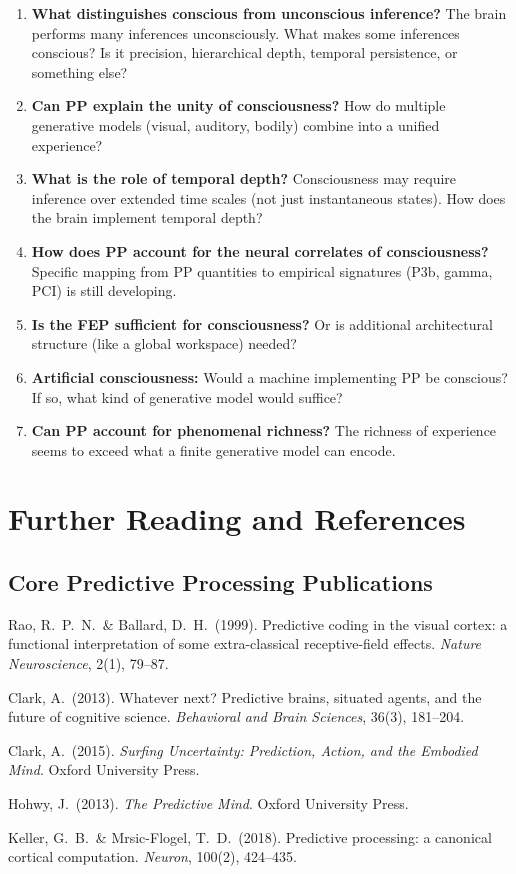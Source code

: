 \documentclass[11pt,a4paper]{report}
\begin{document}
\begin{enumerate}[leftmargin=2em]
  \item \textbf{What distinguishes conscious from unconscious inference?} The brain performs many inferences unconsciously. What makes some inferences conscious? Is it precision, hierarchical depth, temporal persistence, or something else?
  \item \textbf{Can PP explain the unity of consciousness?} How do multiple generative models (visual, auditory, bodily) combine into a unified experience?
  \item \textbf{What is the role of temporal depth?} Consciousness may require inference over extended time scales (not just instantaneous states). How does the brain implement temporal depth?
  \item \textbf{How does PP account for the neural correlates of consciousness?} Specific mapping from PP quantities to empirical signatures (P3b, gamma, PCI) is still developing.
  \item \textbf{Is the FEP sufficient for consciousness?} Or is additional architectural structure (like a global workspace) needed?
  \item \textbf{Artificial consciousness:} Would a machine implementing PP be conscious? If so, what kind of generative model would suffice?
  \item \textbf{Can PP account for phenomenal richness?} The richness of experience seems to exceed what a finite generative model can encode.
\end{enumerate}


\chapter{Further Reading and References}

\section*{Core Predictive Processing Publications}
\begin{enumerate}[label={[\arabic*]}, leftmargin=2.5em]
  \item Rao, R.\ P.\ N.\ \& Ballard, D.\ H.\ (1999). Predictive coding in the visual cortex: a functional interpretation of some extra-classical receptive-field effects. \textit{Nature Neuroscience}, 2(1), 79--87.
  \item Clark, A.\ (2013). Whatever next? Predictive brains, situated agents, and the future of cognitive science. \textit{Behavioral and Brain Sciences}, 36(3), 181--204.
  \item Clark, A.\ (2015). \textit{Surfing Uncertainty: Prediction, Action, and the Embodied Mind}. Oxford University Press.
  \item Hohwy, J.\ (2013). \textit{The Predictive Mind}. Oxford University Press.
  \item Keller, G.\ B.\ \& Mrsic-Flogel, T.\ D.\ (2018). Predictive processing: a canonical cortical computation. \textit{Neuron}, 100(2), 424--435.
\end{enumerate}
\end{document}
